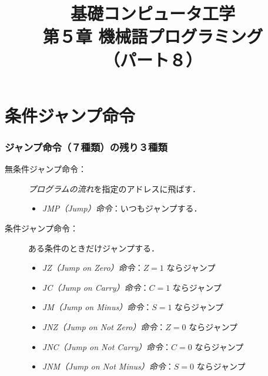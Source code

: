 \documentclass{beamer}                 %
\begin{document}
\title{基礎コンピュータ工学\\第５章 機械語プログラミング\\（パート８）}
\date{}

\begin{frame}
  \titlepage
\end{frame}


\section{条件ジャンプ命令}
\begin{frame}
  \frametitle{ジャンプ命令（７種類）の残り３種類}
  \begin{description}
  \item[無条件ジャンプ命令：]\emph{プログラムの流れ}を指定のアドレスに飛ばす．
    \begin{itemize}
      \item \emph{JMP（Jump）命令}：いつもジャンプする．
    \end{itemize}
    \vfill
  \item[条件ジャンプ命令：]ある条件のときだけジャンプする．
    \begin{itemize}
      \item \emph{JZ（Jump on Zero）命令}：$Z=1$ ならジャンプ
        \vfill
      \item \emph{JC（Jump on Carry）命令}：$C=1$ ならジャンプ
        \vfill
      \item \emph{JM（Jump on Minus）命令}：$S=1$ ならジャンプ
        \vfill
      \item \emph{JNZ（Jump on Not Zero）命令}：$Z=0$ ならジャンプ
        \vfill
      \item \emph{JNC（Jump on Not Carry）命令}：$C=0$ ならジャンプ
        \vfill
      \item \emph{JNM（Jump on Not Minus）命令}：$S=0$ ならジャンプ
    \end{itemize}
  \end{description}
  \vfill
\end{frame}
\end{document}

